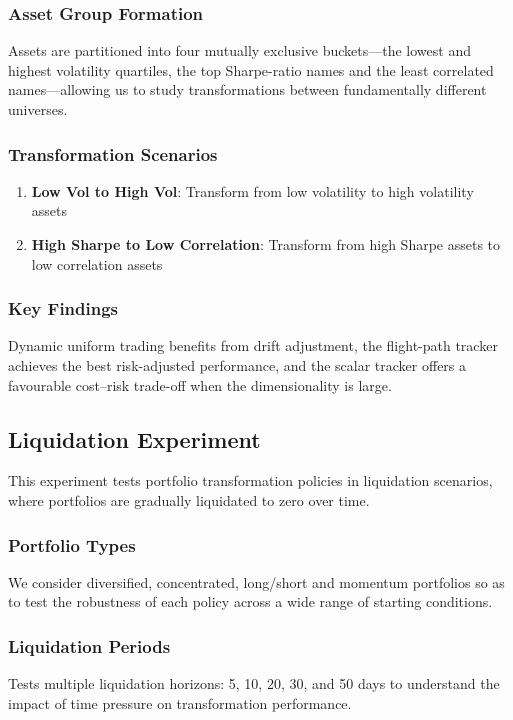 \documentclass[11pt, letterpaper]{article}
\begin{document}
\subsubsection{Asset Group Formation}
Assets are partitioned into four mutually exclusive buckets—the lowest and
highest volatility quartiles, the top Sharpe-ratio names and the least
correlated names—allowing us to study transformations between fundamentally
different universes.

\subsubsection{Transformation Scenarios}
\begin{enumerate}
    \item \textbf{Low Vol to High Vol}: Transform from low volatility to high volatility assets
    \item \textbf{High Sharpe to Low Correlation}: Transform from high Sharpe assets to low correlation assets
\end{enumerate}

\subsubsection{Key Findings}
Dynamic uniform trading benefits from drift adjustment, the flight-path tracker
achieves the best risk-adjusted performance, and the scalar tracker offers a
favourable cost–risk trade-off when the dimensionality is large.

\subsection{Liquidation Experiment}
This experiment tests portfolio transformation policies in liquidation scenarios, where portfolios are gradually liquidated to zero over time.

\subsubsection{Portfolio Types}
We consider diversified, concentrated, long/short and momentum portfolios so
as to test the robustness of each policy across a wide range of starting
conditions.

\subsubsection{Liquidation Periods}
Tests multiple liquidation horizons: 5, 10, 20, 30, and 50 days to understand the impact of time pressure on transformation performance.
\end{document}
